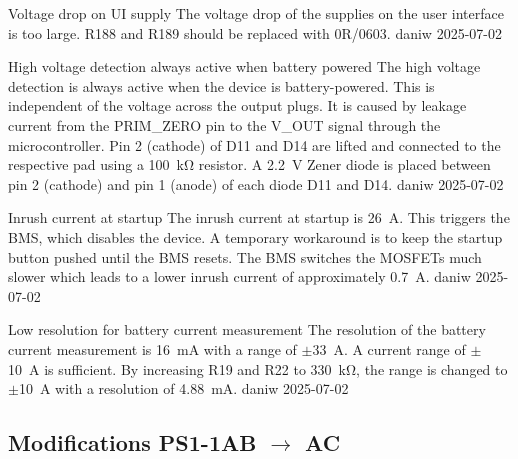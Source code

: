 \begin{ModTable}
\ModItemDone
{Voltage drop on UI supply}
{The voltage drop of the supplies on the user interface is too large. }
{R188 and R189 should be replaced with 0R/0603. }
{daniw}
{2025-07-02}

\ModItemDone
{High voltage detection always active when battery powered}
{The high voltage detection is always active when the device is battery-powered. This is independent of the voltage across the output plugs. It is caused by leakage current from the PRIM\_ZERO pin to the V\_OUT signal through the microcontroller. }
{Pin 2 (cathode) of D11 and D14 are lifted and connected to the respective pad using a \qty{100}{\kilo\ohm} resistor. A \qty{2.2}{\volt} Zener diode is placed between pin 2 (cathode) and pin 1 (anode) of each diode D11 and D14. }
{daniw}
{2025-07-02}

\ModItemDone
{Inrush current at startup}
{The inrush current at startup is \qty{26}{\ampere}. This triggers the \ac{BMS}, which disables the device. }
{A temporary workaround is to keep the startup button pushed until the \ac{BMS} resets. The \ac{BMS} switches the \acp{MOSFET} much slower which leads to a lower inrush current of approximately \qty{0.7}{\ampere}. }
{daniw}
{2025-07-02}

\ModItemDone
{Low resolution for battery current measurement}
{The resolution of the battery current measurement is \qty{16}{\milli\ampere} with a range of $\pm$\qty{33}{\ampere}. A current range of $\pm$\qty{10}{\ampere} is sufficient. }
{By increasing R19 and R22 to \qty{330}{\kilo\ohm}, the range is changed to $\pm$\qty{10}{\ampere} with a resolution of \qty{4.88}{\milli\ampere}. }
{daniw}
{2025-07-02}

\end{ModTable}

\FloatBarrier

\subsection{Modifications PS1-1AB $\to$ AC}

